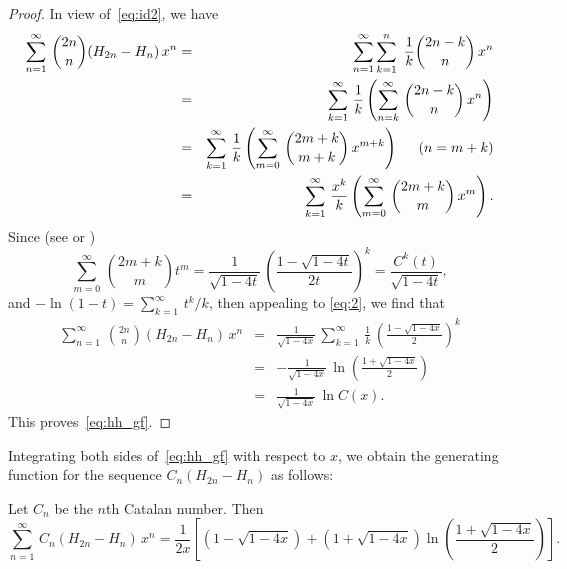 \documentclass[12pt,reqno]{article}
\begin{document}
\begin{proof} In view of~\eqref{eq:id2}, we have
\begin{eqnarray*}
\sum_{n=1}^\infty\,\binom{2n}{n}(H_{2n} - H_n)\,x^n & = & \sum_{n=1}^\infty\sum_{k=1}^n\,\,\frac{1}{k}\binom{2n-k}{n}\,x^n\\
& = & \sum_{k=1}^\infty\,\frac{1}{k}\left(\sum_{n=k}^\infty\,\binom{2n-k}{n}\,x^n\right)\\
& = & \sum_{k=1}^\infty\,\frac{1}{k}\left(\sum_{m=0}^\infty\,\binom{2m + k}{m+k}\,x^{m+k}\right)\hspace{0.2in}(n = m+k)\\
& = & \sum_{k=1}^\infty\,\frac{x^k}{k}\left(\sum_{m=0}^\infty\,\binom{2m + k}{m}\,x^m\right).
\end{eqnarray*}
Since (see \cite[Formula 5.72, p.\ 203]{GKP} or \cite[A32(b), p.\ 116]{Stanley})
$$\sum_{m=0}^\infty\,\binom{2m + k}{m}t^m = \frac{1}{\sqrt{1- 4t}}\,\left(\frac{1 - \sqrt{1-4t}}{2t}\right)^k = \frac{C^k(t)}{\sqrt{1 - 4t}},$$
and $-\ln(1- t) = \sum_{k=1}^\infty\,t^k/k$, then appealing to \eqref{eq:2}, we find that
\begin{eqnarray*}
\sum_{n=1}^\infty\,\binom{2n}{n}(H_{2n} - H_n)\,x^n & = &\frac{1}{\sqrt{1- 4x}}\,\sum_{k=1}^\infty\,\frac{1}{k}\,\left(\frac{1 - \sqrt{1-4x}}{2}\right)^k\\
& = & - \frac{1}{\sqrt{1-4x}}\,\ln\left(\frac{1+\sqrt{1 -4x}}{2}\right)\\
& = & \frac{1}{\sqrt{1-4x}}\,\ln C(x).
\end{eqnarray*}
This proves~\eqref{eq:hh_gf}.
\end{proof}
Integrating both sides of~\eqref{eq:hh_gf} with respect to $x$, we obtain the generating function for the sequence $C_n(H_{2n} - H_n)$ as follows:

\begin{corollary} Let $C_n$ be the $n$th Catalan number. Then
\begin{equation} 
\label{eq:ch_gf}
 \sum_{n=1}^\infty\,C_n(H_{2n} - H_n)\,x^n =  \frac{1}{2x}\left[(1-\sqrt{1-4x}) + (1 + \sqrt{1 -4x})\ln\left(\frac{1+\sqrt{1 -4x}}{2}\right)\right]. \end{equation}
\end{corollary}
\end{document}
